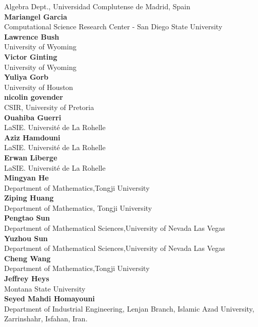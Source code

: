 \documentclass[article,A4,11pt]{llncs}%
\begin{document}
    Algebra Dept., Universidad Complutense de Madrid, Spain\\
        \noindent
    {\bf Mariangel Garcia}\\
    Computational Science Research Center - San Diego State University\\
        \noindent
    {\bf Lawrence Bush}\\
    University of Wyoming\\
        \noindent
    {\bf Victor Ginting}\\
    University of Wyoming\\
        \noindent
    {\bf Yuliya Gorb}\\
    University of Houston\\
        \noindent
    {\bf nicolin govender}\\
    CSIR, University of Pretoria\\
        \noindent
    {\bf Ouahiba Guerri}\\
    LaSIE. Université de La Rohelle\\
        \noindent
    {\bf Aziz Hamdouni}\\
    LaSIE. Université de La Rohelle\\
        \noindent
    {\bf Erwan Liberge}\\
    LaSIE. Université de La Rohelle\\
        \noindent
    {\bf Mingyan He}\\
    Department of Mathematics,Tongji University\\
        \noindent
    {\bf Ziping Huang}\\
    Department of Mathematics, Tongji University\\
        \noindent
    {\bf Pengtao Sun}\\
    Department of Mathematical Sciences,University of Nevada Las Vegas\\
        \noindent
    {\bf Yuzhou Sun}\\
    Department of Mathematical Sciences,University of Nevada Las Vegas\\
        \noindent
    {\bf Cheng Wang}\\
    Department of Mathematics,Tongji University\\
        \noindent
    {\bf Jeffrey Heys}\\
    Montana State University\\
        \noindent
    {\bf Seyed Mahdi Homayouni}\\
    Department of Industrial Engineering, Lenjan Branch, Islamic Azad University, Zarrinshahr, Isfahan, Iran.\\
\end{document}
